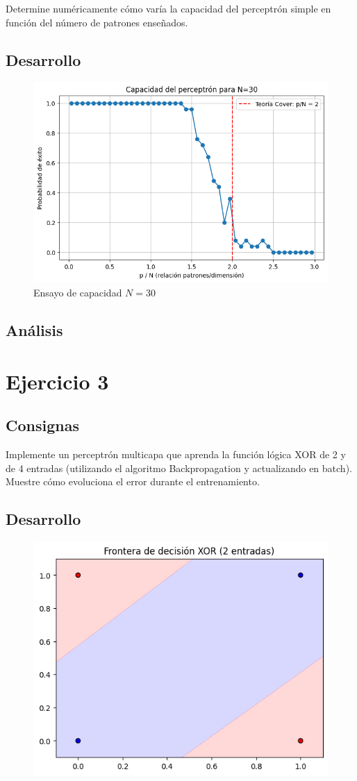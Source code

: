 \documentclass[11pt]{article} %
\begin{document}
Determine numéricamente cómo varía la capacidad del perceptrón simple en función del número de patrones enseñados.


\subsection{Desarrollo}


\begin{figure}[h!]
	\centering
	\includegraphics[width=0.7\linewidth]{../imgs/ej2/capacidad}
	\caption[]{Ensayo de capacidad $N=30$}
	\label{fig:capacidad}
\end{figure}


\subsection{Análisis}

\section{Ejercicio 3}

\subsection{Consignas}

Implemente un perceptrón multicapa que aprenda la función lógica XOR de 2 y de 4 entradas (utilizando el algoritmo Backpropagation y actualizando en batch). Muestre cómo evoluciona el error durante el entrenamiento.

\subsection{Desarrollo}
\begin{figure}
	\centering
	\includegraphics[width=0.7\linewidth]{imgs/ej3_frontera_xor}
	\caption{}
	\label{fig:ej3fronteraxor}
\end{figure}
\end{document}
